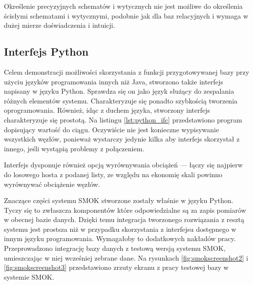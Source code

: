 \documentclass[a4paper,polish,12pt,twoside]{article}
\newcommand{\WorkLineSpread}{1.5}
\begin{document}
Określenie precyzyjnych schematów i wytycznych nie jest możliwe do określenia ścisłymi schematami i wytycznymi, podobnie jak dla baz relacyjnych i wymaga w dużej mierze doświadczenia i intuicji.

	\subsection{Interfejs Python}
Celem demonstracji możliwości skorzystania z funkcji przygotowywanej bazy przy użyciu języków programowania innych niż Java, stworzono także interfejs napisany w języku Python. Sprawdza się on jako język służący do zespalania różnych elementów systemu. Charakteryzuje się ponadto szybkością tworzenia oprogramowania. Również, idąc  z duchem języka, stworzony interfejs charakteryzuje się prostotą. Na listingu \ref{lst:python_ifc} przedstawiono program dopisujący wartość do ciągu. Oczywiście nie jest konieczne wypisywanie wszystkich węzłów, ponieważ wystarczy jedynie kilka aby interfejs skorzystał z innego, jeśli wystąpią problemy z połączeniem.

Interfejs dysponuje również opcją wyrównywania obciążeń --- łączy się najpierw do losowego hosta z podanej listy, ze względu na ekonomię skali powinno wyrównywać obciążenie węzłów.

\begin{listing}
\linespread{1} \small  \linespread{\WorkLineSpread} \normalsize
\end{listing}

Znaczące części systemu SMOK stworzone zostały właśnie w języku Python. Tyczy się to zwłaszcza komponentów które odpowiedzialne są za zapis pomiarów w obecnej bazie danych. Dzięki temu integracja tworzonego rozwiązania z resztą systemu jest prostsza niż w przypadku skorzystania z interfejsu dostępnego w innym języku programowania. Wymagałoby to dodatkowych nakładów pracy. Przeprowadzono integrację bazy danych z testową wersją systemu SMOK, umieszczając w niej wcześniej zebrane dane. Na rysunkach \ref{fig:smokscreenshot2} i \ref{fig:smokscreenshot3} przedstawiono zrzuty ekranu z pracy testowej bazy w systemie SMOK.
\end{document}
